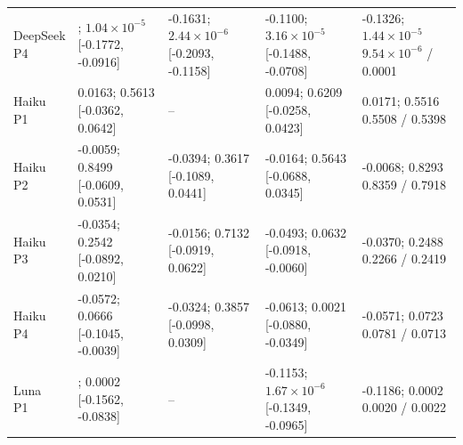 \begin{table}[tbp]
\begin{tabularx}{\linewidth}{@{}lXXXX@{}}
\shortstack[l]{DeepSeek\\{}P4} & \shortstack[l]{{\bfseries\boldmath -0.1341}; $1.04\times10^{-5}$\\{}[-0.1772, -0.0916]} & \shortstack[l]{-0.1631; $2.44\times10^{-6}$\\{}[-0.2093, -0.1158]} & \shortstack[l]{-0.1100; $3.16\times10^{-5}$\\{}[-0.1488, -0.0708]} & \shortstack[l]{-0.1326; $1.44\times10^{-5}$\\{}$9.54\times10^{-6}$ / 0.0001} \\
\shortstack[l]{Haiku\\{}P1} & \shortstack[l]{0.0163; 0.5613\\{}[-0.0362, 0.0642]} & -- & \shortstack[l]{0.0094; 0.6209\\{}[-0.0258, 0.0423]} & \shortstack[l]{0.0171; 0.5516\\{}0.5508 / 0.5398} \\
\shortstack[l]{Haiku\\{}P2} & \shortstack[l]{-0.0059; 0.8499\\{}[-0.0609, 0.0531]} & \shortstack[l]{-0.0394; 0.3617\\{}[-0.1089, 0.0441]} & \shortstack[l]{-0.0164; 0.5643\\{}[-0.0688, 0.0345]} & \shortstack[l]{-0.0068; 0.8293\\{}0.8359 / 0.7918} \\
\shortstack[l]{Haiku\\{}P3} & \shortstack[l]{-0.0354; 0.2542\\{}[-0.0892, 0.0210]} & \shortstack[l]{-0.0156; 0.7132\\{}[-0.0919, 0.0622]} & \shortstack[l]{-0.0493; 0.0632\\{}[-0.0918, -0.0060]} & \shortstack[l]{-0.0370; 0.2488\\{}0.2266 / 0.2419} \\
\shortstack[l]{Haiku\\{}P4} & \shortstack[l]{-0.0572; 0.0666\\{}[-0.1045, -0.0039]} & \shortstack[l]{-0.0324; 0.3857\\{}[-0.0998, 0.0309]} & \shortstack[l]{-0.0613; 0.0021\\{}[-0.0880, -0.0349]} & \shortstack[l]{-0.0571; 0.0723\\{}0.0781 / 0.0713} \\
\shortstack[l]{Luna\\{}P1} & \shortstack[l]{{\bfseries\boldmath -0.1198}; 0.0002\\{}[-0.1562, -0.0838]} & -- & \shortstack[l]{-0.1153; $1.67\times10^{-6}$\\{}[-0.1349, -0.0965]} & \shortstack[l]{-0.1186; 0.0002\\{}0.0020 / 0.0022} \\

\end{tabularx}
\end{table}
